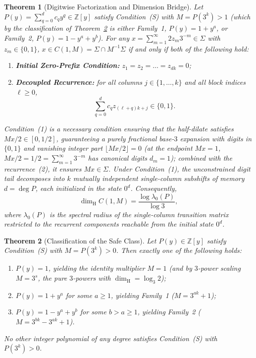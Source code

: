 \documentclass[11pt,reqno]{amsart}
\theoremstyle{plain}
\newtheorem{theorem}{Theorem}[section]
\theoremstyle{definition}
\theoremstyle{remark}
\newcommand{\Z}{\mathbb{Z}}
\newcommand{\dimH}{\dim_{\mathrm{H}}}
\begin{document}
\begin{theorem}[Digitwise Factorization and Dimension Bridge]\label{thm:factorization_bridge}
Let $P(y) = \sum_{q=0}^d c_q y^q \in \Z[y]$ satisfy Condition~(S) with $M = P(3^k) > 1$ (which by the classification of Theorem~\ref{thm:classification} is either Family~1, $P(y) = 1 + y^a$, or Family~2, $P(y) = 1 - y^a + y^b$). For any $x = \sum_{m=1}^\infty 2 z_m 3^{-m} \in \Sigma$ with $z_m \in \{0, 1\}$, $x \in C(1, M) = \Sigma \cap M^{-1}\Sigma$ if and only if both of the following hold:
\begin{enumerate}
    \item \textbf{Initial Zero-Prefix Condition:} $z_1 = z_2 = \dots = z_{dk} = 0$;
    \item \textbf{Decoupled Recurrence:} for all columns $j \in \{1, \dots, k\}$ and all block indices $\ell \ge 0$,
    \begin{equation}
    \sum_{q=0}^d c_q z_{(\ell+q)k + j} \in \{0, 1\}.
    \end{equation}
\end{enumerate}
Condition~(1) is a necessary condition ensuring that the half-dilate satisfies $M x / 2 \in [0, 1/2]$, guaranteeing a purely fractional base-$3$ expansion with digits in $\{0, 1\}$ and vanishing integer part $\lfloor M x / 2 \rfloor = 0$ (at the endpoint $M x = 1$, $M x / 2 = 1/2 = \sum_{m=1}^\infty 3^{-m}$ has canonical digits $d_m = 1$); combined with the recurrence~(2), it ensures $M x \in \Sigma$. Under Condition~(1), the unconstrained digit tail decomposes into $k$ mutually independent single-column subshifts of memory $d = \deg P$, each initialized in the state $0^d$. Consequently,
\begin{equation}
\dimH C(1, M) = \frac{\log \lambda_0(P)}{\log 3},
\end{equation}
where $\lambda_0(P)$ is the spectral radius of the single-column transition matrix restricted to the recurrent components reachable from the initial state $0^d$.
\end{theorem}

\begin{theorem}[Classification of the Safe Class]\label{thm:classification}
Let $P(y) \in \Z[y]$ satisfy Condition~(S) with $M = P(3^k) > 0$. Then exactly one of the following holds:
\begin{enumerate}
    \item $P(y) = 1$, yielding the identity multiplier $M = 1$ (and by $3$-power scaling $M = 3^s$, the pure $3$-powers with $\dimH = \log_3 2$);
    \item $P(y) = 1 + y^a$ for some $a \ge 1$, yielding Family~1 ($M = 3^{ak} + 1$);
    \item $P(y) = 1 - y^a + y^b$ for some $b > a \ge 1$, yielding Family~2 ($M = 3^{bk} - 3^{ak} + 1$).
\end{enumerate}
No other integer polynomial of any degree satisfies Condition~(S) with $P(3^k) > 0$.
\end{theorem}
\end{document}
